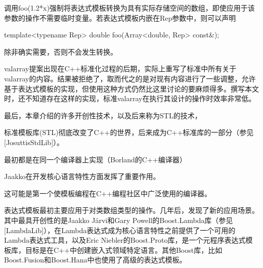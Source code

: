 调用foo(1.2*x)强制将表达式模板转换为具有实际存储空间的数组，即使应用于该参数的操作不需要临时变量。若表达式模板内嵌在Rep参数中，则可以声明

\begin{cpp}
template<typename Rep>
double foo(Array<double, Rep> const&);
\end{cpp}

除非确实需要，否则不会发生转换。

valarray提案出现在C++标准化过程的后期，实际上重写了标准中所有关于valarray的内容。结果被拒绝了，取而代之的是对现有内容进行了一些调整，允许基于表达式模板的实现，但使用这种方式仍然比这里讨论的要麻烦得多。撰写本文时，还不知道存在这样的实现，标准valarray在执行其设计的操作时效率非常低。

最后，本章介绍的许多开创性技术，以及后来称为STL的技术，

\begin{notice}
标准模板库(STL)彻底改变了C++的世界，后来成为C++标准库的一部分（参见[JosuttisStdLib]）。
\end{notice}

最初都是在同一个编译器上实现（Borland的C++编译器）

\begin{notice}
Jaakko在开发核心语言特性方面发挥了重要作用。
\end{notice}

这可能是第一个使模板编程在C++编程社区中广泛使用的编译器。

表达式模板最初主要应用于对类数组类型的操作。几年后，发现了新的应用场景。其中最具开创性的是Jaakko J{\"a}rvi和Gary Powell的Boost.Lambda库（参见[LambdaLib]），在Lambda表达式成为核心语言特性之前提供了一个可用的Lambda表达式工具，以及Eric Niebler的Boost.Proto库，是一个元程序表达式模板库，目标是在C++中创建嵌入式领域特定语言。其他Boost库，比如Boost.Fusion和Boost.Hana中也使用了高级的表达式模板。



































